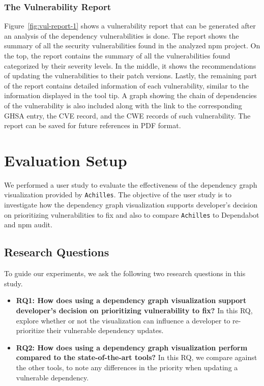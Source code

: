 \documentclass[conference]{IEEEtran}
\begin{document}
	\subsubsection{The Vulnerability Report}
	Figure~\ref{fig:vul-report-1} shows a vulnerability report that can be generated after an analysis of the dependency vulnerabilities is done. The report shows the summary of all the security vulnerabilities found in the analyzed npm project. On the top, the report contains the summary of all the vulnerabilities found categorized by their severity levels. 
	In the middle, it shows the recommendations of updating the vulnerabilities to their patch versions. Lastly, the remaining part of the report contains detailed information of each vulnerability, similar to the information displayed in the tool tip. 
	A graph showing the chain of dependencies of the vulnerability is also included along with the link to the corresponding GHSA entry, the CVE record, and the CWE records of such vulnerability. 
	The report can be saved for future references in PDF format.

	\section{Evaluation Setup}
	We performed a user study to evaluate the effectiveness of the dependency graph visualization provided by \texttt{Achilles}.
	The objective of the user study is to investigate how the dependency graph visualization supports developer’s decision on prioritizing vulnerabilities to fix and also to compare \texttt{Achilles} to Dependabot and npm audit. 
	
	\subsection{Research Questions}
	To guide our experiments, we ask the following two research questions in this study.
	
	\begin{itemize}
		\item \textbf{RQ1: How does using a dependency graph visualization support developer’s decision on prioritizing vulnerability to fix?} In this RQ, explore whether or not the visualization can influence a developer to re-prioritize their vulnerable dependency updates.
		\item \textbf{RQ2: How does using a dependency graph visualization perform compared to the state-of-the-art tools?} In this RQ, we compare against the other tools, to note any differences in the priority when updating a vulnerable dependency.
	\end{itemize}
	
\end{document}

